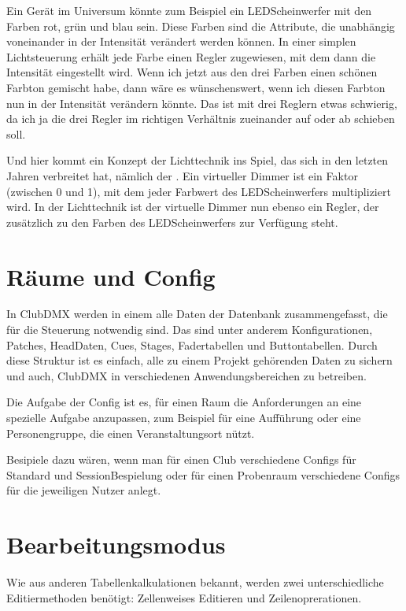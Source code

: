 \documentclass[letterpaper,10pt,ngerman]{sphinxmanual}
\begin{document}
Ein Gerät im Universum könnte zum Beispiel ein LED\sphinxhyphen{}Scheinwerfer mit den
Farben rot, grün und blau sein. Diese Farben sind die Attribute, die unabhängig
voneinander in der Intensität verändert werden können.
In einer simplen Lichtsteuerung erhält jede Farbe einen Regler zugewiesen,
mit dem dann die Intensität eingestellt wird.
Wenn ich jetzt aus den drei Farben einen schönen Farbton gemischt habe,
dann wäre es wünschenswert, wenn ich diesen Farbton nun in der Intensität
verändern könnte. Das ist mit drei Reglern etwas schwierig, da ich ja
die drei Regler im richtigen Verhältnis zueinander auf oder ab schieben soll.

Und hier kommt ein Konzept der Lichttechnik ins Spiel, das sich
in den letzten Jahren verbreitet hat, nämlich der .
Ein virtueller Dimmer ist ein Faktor (zwischen 0 und 1),
mit dem jeder Farbwert des LED\sphinxhyphen{}Scheinwerfers multipliziert wird.
In der Lichttechnik ist der virtuelle Dimmer nun ebenso ein Regler,
der zusätzlich zu den Farben des LED\sphinxhyphen{}Scheinwerfers zur Verfügung steht.


\section{Räume und Config}
\label{\detokenize{grundlagen:raume-und-config}}\label{\detokenize{grundlagen:raum-config-label}}
In ClubDMX werden in einem  alle Daten der Datenbank zusammengefasst, die
für die Steuerung notwendig sind. Das sind unter anderem Konfigurationen,
Patches, Head\sphinxhyphen{}Daten, Cues, Stages, Fadertabellen und Buttontabellen.
Durch diese Struktur ist es einfach, alle zu einem Projekt gehörenden Daten
zu sichern und auch, ClubDMX in verschiedenen Anwendungsbereichen zu betreiben.

Die Aufgabe der Config ist es, für einen Raum die Anforderungen an eine spezielle
Aufgabe anzupassen, zum Beispiel für eine Aufführung oder eine
Personengruppe, die einen Veranstaltungsort nützt.

Besipiele dazu wären, wenn man für einen Club verschiedene Configs für
Standard\sphinxhyphen{} und Session\sphinxhyphen{}Bespielung oder für einen Probenraum verschiedene
Configs für die jeweiligen Nutzer anlegt.


\section{Bearbeitungsmodus}
\label{\detokenize{grundlagen:bearbeitungsmodus}}\label{\detokenize{grundlagen:bearbeitungsmoduslabel}}
Wie aus anderen Tabellenkalkulationen bekannt, werden zwei unterschiedliche
Editiermethoden benötigt: Zellenweises Editieren und Zeilenoprerationen.
\end{document}
